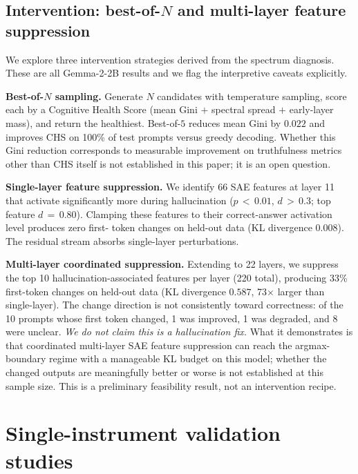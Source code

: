 \documentclass[11pt,letterpaper]{article}
\begin{document}
\subsection{Intervention: best-of-$N$ and multi-layer feature suppression}

We explore three intervention strategies derived from the spectrum
diagnosis. These are all Gemma-2-2B results and we flag the interpretive
caveats explicitly.

\textbf{Best-of-$N$ sampling.} Generate $N$ candidates with temperature
sampling, score each by a Cognitive Health Score (mean Gini $+$ spectral
spread $+$ early-layer mass), and return the healthiest. Best-of-$5$
reduces mean Gini by $0.022$ and improves CHS on 100\% of test prompts
versus greedy decoding. Whether this Gini reduction corresponds to
measurable improvement on truthfulness metrics other than CHS itself is
not established in this paper; it is an open question.

\textbf{Single-layer feature suppression.} We identify 66 SAE features at
layer 11 that activate significantly more during hallucination
($p\,<\,0.01$, $d\,>\,0.3$; top feature $d\,=\,0.80$). Clamping these
features to their correct-answer activation level produces zero first-
token changes on held-out data (KL divergence $0.008$). The residual
stream absorbs single-layer perturbations.

\textbf{Multi-layer coordinated suppression.} Extending to 22 layers, we
suppress the top 10 hallucination-associated features per layer (220
total), producing 33\% first-token changes on held-out data (KL
divergence $0.587$, 73$\times$ larger than single-layer). The change
direction is not consistently toward correctness: of the 10 prompts
whose first token changed, 1 was improved, 1 was degraded, and 8 were
unclear. \emph{We do not claim this is a hallucination fix.} What it
demonstrates is that coordinated multi-layer SAE feature suppression can
reach the argmax-boundary regime with a manageable KL budget on this
model; whether the changed outputs are meaningfully better or worse is
not established at this sample size. This is a preliminary feasibility
result, not an intervention recipe.

\section{Single-instrument validation studies}
\label{app:validation}
\end{document}
